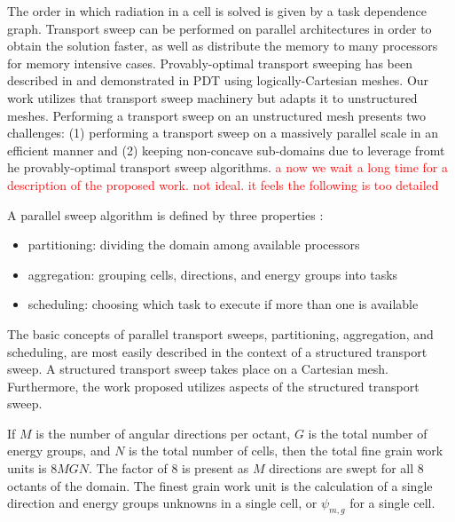 \documentclass{anstrans}
\newcommand{\tcr}[1]{\textcolor{red}{#1}}
\begin{document}
The order in which radiation in a cell is solved is given by a task dependence graph. Transport sweep can be performed on parallel architectures in order to obtain the solution faster, as well as distribute the memory to many processors for memory intensive cases. Provably-optimal transport sweeping has been described in \cite{mpadams2013} and demonstrated in PDT using logically-Cartesian meshes. Our work utilizes that transport sweep machinery but adapts it to unstructured meshes. Performing a transport sweep on an unstructured mesh presents two challenges: (1) performing a transport sweep on a massively parallel scale in an efficient manner and (2) keeping non-concave sub-domains due to leverage fromt he provably-optimal transport sweep algorithms. 
\tcr{a now we wait a long time for a description of the proposed work. not ideal. it feels the following is too detailed}

A parallel sweep algorithm is defined by three properties \cite{mpadams2013} :
\begin{itemize}
\item partitioning: dividing the domain among available processors
\item aggregation: grouping cells, directions, and energy groups into tasks
\item scheduling: choosing which task to execute if more than one is available
\end{itemize}

The basic concepts of parallel transport sweeps, partitioning, aggregation, and scheduling, are most easily described in the context of a structured transport sweep. A structured transport sweep takes place on a Cartesian mesh. Furthermore, the work proposed utilizes aspects of the structured transport sweep.

If $M$ is the number of angular directions per octant, $G$ is the total number of energy groups, and $N$ is the total number of cells, then the total fine grain work units is $8MGN$. The factor of 8 is present as $M$ directions are swept for all 8 octants of the domain. The finest grain work unit is the calculation of a single direction and energy groups unknowns in a single cell, or $\psi_{m,g}$ for a single cell.
\end{document}
